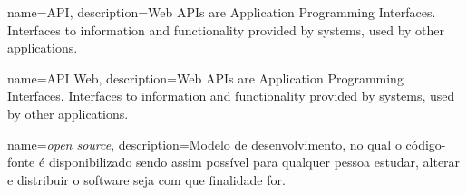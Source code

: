 \label{terminologia}

{
	name=API,
	description={Web APIs are Application Programming Interfaces. Interfaces to information and functionality provided by systems, used by other applications.}
}

{
	name={API Web},
	description={Web APIs are Application Programming Interfaces. Interfaces to information and functionality provided by systems, used by other applications.}
}

{
	name={\textit{open source}},
	description={Modelo de desenvolvimento, no qual o código-fonte é disponibilizado sendo assim possível para qualquer pessoa estudar, alterar e distribuir o software seja com que finalidade for.}
}